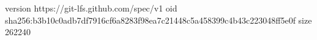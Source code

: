 version https://git-lfs.github.com/spec/v1
oid sha256:b3b10c0adb7df7916cf6a8283f98ea7c21448c5a458399c4b43c223048ff5e0f
size 262240
